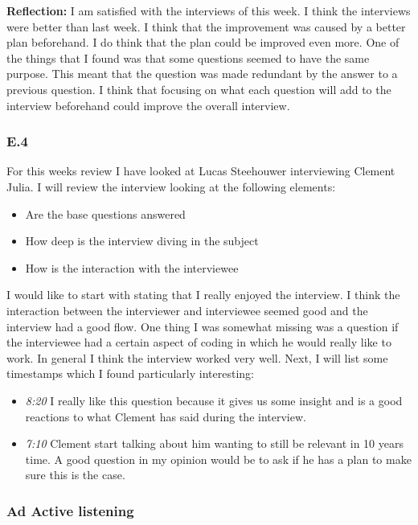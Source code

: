 \documentclass[]{article}
\begin{document}
\noindent\textbf{Reflection: }
I am satisfied with the interviews of this week. I think the interviews were 
better than last week. I think that the improvement was caused by a better 
plan beforehand. I do think that the plan could be improved even more. 
One of the things that I found was that some questions seemed to have the same 
purpose. This meant that the question was made redundant by the answer to a 
previous question. I think that focusing on what each question will add 
to the interview beforehand could improve the overall interview.

\subsubsection*{E.4}
For this weeks review I have looked at Lucas Steehouwer interviewing Clement Julia.
I will review the interview looking at the following elements:
\begin{itemize}
    \item Are the base questions answered
    \item How deep is the interview diving in the subject
    \item How is the interaction with the interviewee
\end{itemize}

\noindent I would like to start with stating that I really enjoyed the interview.
I think the interaction between the interviewer and interviewee seemed good and 
the interview had a good flow. One thing I was somewhat missing was a question 
if the interviewee had a certain aspect of coding in which he would really like 
to work. In general I think the interview worked very well. Next, I will list 
some timestamps which I found particularly interesting:

\begin{itemize}
    \item[] \textit{8:20} I really like this question because it gives us some 
    insight and is a good reactions to what Clement has said during the interview. 
    \item[] \textit{7:10} Clement start talking about him wanting to still be 
    relevant in 10 years time. A good question in my opinion would be to ask 
    if he has a plan to make sure this is the case. 
\end{itemize}




\subsubsection*{Ad Active listening}
\end{document}

